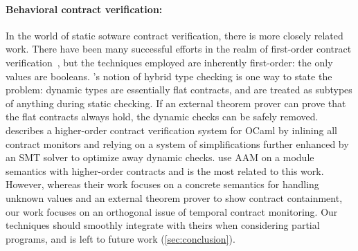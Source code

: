 \paragraph{Behavioral contract verification:}
In the world of static sotware contract verification, there is more closely related work.
%
There have been many successful efforts in the realm of first-order contract verification~\citep{ianjohnson:fahndrich:contracts:2011,ianjohnson:vcc:2009}, but the techniques employed are inherently first-order: the only values are booleans.
%
\citet{ianjohnson:Flanagan:2006:HTC:1111037.1111059}'s notion of hybrid type checking is one way to state the problem: dynamic types are essentially flat contracts, and are treated as subtypes of anything during static checking.
%
If an external theorem prover can prove that the flat contracts always hold, the dynamic checks can be safely removed.
%
\citet{dvanhorn:Xu2012Hybrid} describes a higher-order contract verification system for OCaml by inlining all contract monitors and relying on a system of simplifications further enhanced by an SMT solver to optimize away dynamic checks.
%
\citet{dvanhorn:TobinHochstadt2012Higherorder} use AAM on a module semantics with higher-order contracts and is the most related to this work.
%
However, whereas their work focuses on a concrete semantics for handling unknown values and an external theorem prover to show contract containment, our work focuses on an orthogonal issue of temporal contract monitoring.
%
Our techniques should smoothly integrate with theirs when considering partial programs, and is left to future work (\cref{sec:conclusion}).
